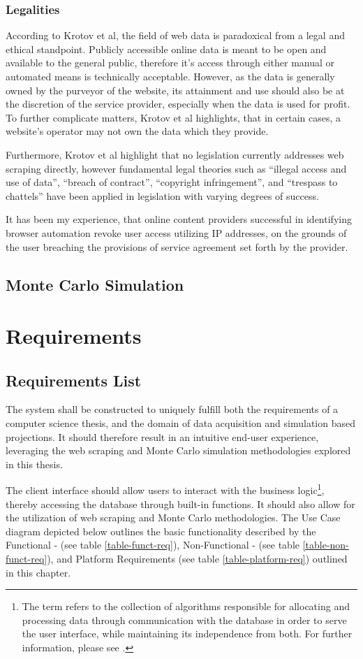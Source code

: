 \documentclass{thesis-ekf}
\theoremstyle{definition}
\theoremstyle{remark}
\begin{document}
\subsection{Legalities}
According to Krotov et al, the field of web data is paradoxical from a legal and ethical standpoint. Publicly accessible online data is meant to be open and available to the general public, therefore it's access through either manual or automated means is technically acceptable. However, as the data is generally owned by the purveyor of the website, its attainment and use should also be at the discretion of the service provider, especially when the data is used for profit. To further complicate matters, Krotov et al highlights, that in certain cases, a website's operator may not own the data which they provide.

Furthermore, Krotov et al highlight that no legislation currently addresses web scraping directly, however fundamental legal theories such as “illegal access and use of data”, “breach of contract”, “copyright infringement”, and “trespass to chattels” have been applied in legislation with varying degrees of success.

It has been my experience, that online content providers successful in identifying browser automation revoke user access utilizing IP addresses, on the grounds of the user breaching the provisions of service agreement set forth by the provider.


\section{Monte Carlo Simulation}




\chapter{Requirements}

\section{Requirements List}
The system shall be constructed to uniquely fulfill both the requirements of a computer science thesis, and the domain of data acquisition and simulation based projections. It should therefore result in an intuitive end-user experience, leveraging the web scraping and Monte Carlo simulation methodologies explored in this thesis.

The client interface should allow users to interact with the business logic\footnote{The term refers to the collection of algorithms responsible for allocating and processing data through communication with the database in order to serve the user interface, while maintaining its independence from both. For further information, please see \cite{Booch}.}, thereby accessing the database through built-in functions. It should also allow for the utilization of web scraping and Monte Carlo methodologies. The Use Case diagram depicted below outlines the basic functionality described by the Functional - (see table {\ref{table-funct-req}}), Non-Functional - (see table {\ref{table-non-funct-req}}), and Platform Requirements (see table {\ref{table-platform-req}}) outlined in this chapter.
\end{document}
